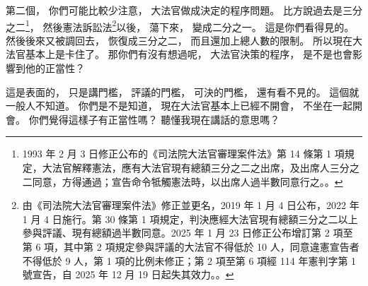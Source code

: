 \hypertarget{w01:cue:903}{}第二個，
\hypertarget{w01:cue:904}{}你們可能比較少注意，
\hypertarget{w01:cue:905}{}大法官做成決定的程序問題。
\hypertarget{w01:cue:906}{}比方說過去是三分之二\footnote{1993 年 2 月 3 日修正公布的《司法院大法官審理案件法》第 14 條第 1 項規定，大法官解釋憲法，應有大法官現有總額三分之二之出席，及出席人三分之二同意，方得通過；宣告命令牴觸憲法時，以出席人過半數同意行之。\cite{dfgslaw1993}。}，
\hypertarget{w01:cue:907}{}然後憲法訴訟法\footnote{由《司法院大法官審理案件法》修正並更名，2019 年 1 月 4 日公布，2022 年 1 月 4 日施行。第 30 條第 1 項規定，判決應經大法官現有總額三分之二以上參與評議、現有總額過半數同意。2025 年 1 月 23 日修正公布增訂第 2 項至第 6 項，其中第 2 項規定參與評議的大法官不得低於 10 人，同意違憲宣告者不得低於 9 人，第 1 項的比例未修正；第 2 項至第 6 項經 114 年憲判字第 1 號宣告，自 2025 年 12 月 19 日起失其效力。\cite{csfa}。}以後，
\hypertarget{w01:cue:908}{}蕩下來，
\hypertarget{w01:cue:909}{}變成二分之一。
\hypertarget{w01:cue:910}{}這是你們看得見的。
\hypertarget{w01:cue:911}{}然後後來又被調回去，
\hypertarget{w01:cue:912}{}恢復成三分之二，
\hypertarget{w01:cue:913}{}而且還加上總人數的限制。
\hypertarget{w01:cue:914}{}所以現在大法官基本上是卡住了。
\hypertarget{w01:cue:915}{}那你們有沒有想過呢，
\hypertarget{w01:cue:916}{}大法官決策的程序，
\hypertarget{w01:cue:917}{}是不是也會影響到他的正當性？

\hypertarget{w01:cue:918}{}這是表面的，
\hypertarget{w01:cue:919}{}只是講門檻，
\hypertarget{w01:cue:920}{}評議的門檻，
\hypertarget{w01:cue:921}{}可決的門檻，
\hypertarget{w01:cue:922}{}還有看不見的。
\hypertarget{w01:cue:923}{}這個就一般人不知道。
\hypertarget{w01:cue:924}{}你們是不是知道，
\hypertarget{w01:cue:925}{}現在大法官基本上已經不開會，
\hypertarget{w01:cue:926}{}不坐在一起開會。
\hypertarget{w01:cue:927}{}你們覺得這樣子有正當性嗎？
\hypertarget{w01:cue:928}{}聽懂我現在講話的意思嗎？

